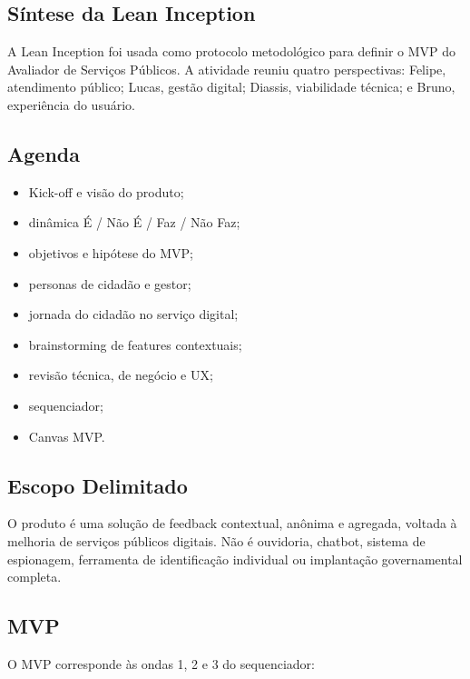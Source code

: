 \begin{apendicesenv}

\partapendices

\chapter{Síntese da Lean Inception}

A Lean Inception foi usada como protocolo metodológico para definir o MVP do
Avaliador de Serviços Públicos. A atividade reuniu quatro perspectivas: Felipe,
atendimento público; Lucas, gestão digital; Diassis, viabilidade técnica; e
Bruno, experiência do usuário.

\section*{Agenda}

\begin{itemize}
    \item Kick-off e visão do produto;
    \item dinâmica É / Não É / Faz / Não Faz;
    \item objetivos e hipótese do MVP;
    \item personas de cidadão e gestor;
    \item jornada do cidadão no serviço digital;
    \item brainstorming de features contextuais;
    \item revisão técnica, de negócio e UX;
    \item sequenciador;
    \item Canvas MVP.
\end{itemize}

\section*{Escopo Delimitado}

O produto é uma solução de feedback contextual, anônima e agregada, voltada à
melhoria de serviços públicos digitais. Não é ouvidoria, chatbot, sistema de
espionagem, ferramenta de identificação individual ou implantação governamental
completa.

\section*{MVP}

O MVP corresponde às ondas 1, 2 e 3 do sequenciador:


\end{apendicesenv}
